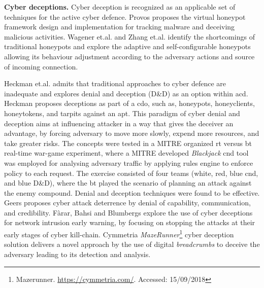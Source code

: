 \textbf{Cyber deceptions.}
Cyber deception is recognized as an applicable set of techniques for the active cyber defence.
Provos \cite{Provos2004} proposes the virtual honeypot framework design and implementation for tracking malware and deceiving malicious activities. 
Wagener et.al. \cite{Wagener2011} and Zhang et.al. \cite{Zhang2017} identify the shortcomings of traditional honeypots and explore the adaptive and self-configurable honeypots allowing its behaviour adjustment according to the adversary actions and source of incoming connection.

Heckman et.al. \cite{Heckman2013} \cite{Heckman2015} admits that traditional approaches to cyber defence are inadequate and explores denial and deception (D\&D) as an option within \gls{acd}. Heckman proposes deceptions as part of a \gls{cdo}, such as, honeypots, honeyclients, honeytokens, and tarpits against an \gls{apt}. This paradigm of cyber denial and deception aims at influencing attacker in a way that gives the deceiver an advantage, by forcing adversary to move more slowly, expend more resources, and take greater risks.
The concepts were tested in a MITRE organized \gls{rt} versus \gls{bt} real-time war-game experiment, where a MITRE developed \textit{Blackjack} \gls{cnd} tool was employed for analysing adversary traffic by applying rules engine to enforce policy to each request. The exercise consisted of four teams (white, red, blue \gls{cnd}, and blue D\&D), where the \gls{bt} played the scenario of planning an attack against the enemy compound. Denial and deception techniques were found to be effective.
Geers \cite{Geers2010} proposes cyber attack deterrence by denial of capability, communication, and credibility.
F\`{a}rar, Bahsi and Blumbergs \cite{Farar2017} explore the use of cyber deceptions for network intrusion early warning, by focusing on stopping the attacks at their early stages of cyber kill-chain.
Cymmetria \textit{MazeRunner}\footnote{\label{fnote:mazerunner}Mazerunner. \url{https://cymmetria.com/}. Accessed: 15/09/2018} cyber deception solution delivers a novel approach by the use of digital \textit{breadcrumbs} to deceive the adversary leading to its detection and analysis.


